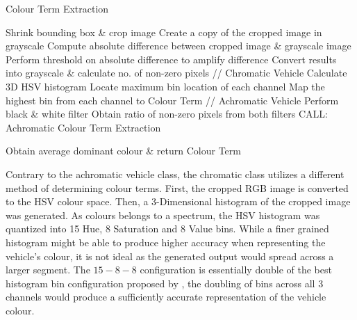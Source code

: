  \begin{algorithm}[!ht]
  \caption{Colour Term Extraction}
  \label{algo:colorExtract}
  \begin{algorithmic}[1]
        \STATE Shrink bounding box \& crop image
        \STATE Create a copy of the cropped image in grayscale
        \STATE Compute absolute difference between cropped image \& grayscale image
        \STATE Perform threshold on absolute difference to amplify difference
        \STATE Convert results into grayscale \& calculate no. of non-zero pixels
                \STATE // Chromatic Vehicle
                \STATE Calculate 3D HSV histogram
                \STATE Locate maximum bin location of each channel
                \STATE Map the highest bin from each channel to Colour Term
            \ELSE
                \STATE // Achromatic Vehicle
                \STATE Perform black \& white filter
                \STATE Obtain ratio of non-zero pixels from both filters
                \STATE CALL: Achromatic Colour Term Extraction
            \ENDIF

    \ENDFOR
    \STATE Obtain average dominant colour \& return Colour Term
  \end{algorithmic}
\end{algorithm}

Contrary to the achromatic vehicle class, the chromatic class utilizes a different method of determining colour terms.
First, the cropped RGB image is converted to the HSV colour space. Then, a 3-Dimensional histogram of the cropped image was generated.
As colours belongs to a spectrum, the HSV histogram was quantized into 15 Hue, 8 Saturation and 8 Value bins.
While a finer grained histogram might be able to produce higher accuracy when representing the vehicle's colour, it is not ideal as the generated output would spread across a larger segment.
The $15-8-8$ configuration is essentially double of the best histogram bin configuration proposed by \cite{kim2008deciding}, the doubling of bins across all 3 channels would produce a sufficiently accurate representation of the vehicle colour.



